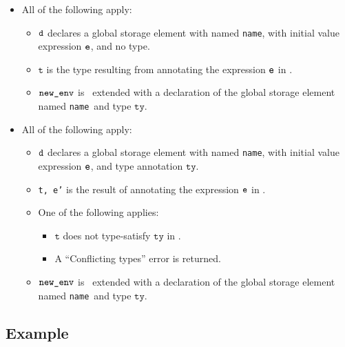 \documentclass{book}
\newcommand\vt[0]{\texttt{t}}
\newcommand\tty[0]{\texttt{ty}}
\newcommand\vep[0]{\texttt{e'}}
\newcommand\name[0]{\texttt{name}}
\begin{document}
\begin{itemize}
  \item All of the following apply:
  \begin{itemize}
    \item $\texttt{d}$ declares a global storage element with named \name, with initial value expression $\texttt{e}$, and no type.
    \item $\vt$ is the type resulting from annotating the expression $\texttt{e}$ in \tenv.
    \item $\texttt{new\_env}$ is \tenv\ extended with a declaration of the global storage element named \name\ and type $\tty$.
  \end{itemize}

  \item All of the following apply:
  \begin{itemize}
    \item $\texttt{d}$ declares a global storage element with named \name, with initial value expression $\texttt{e}$, and type annotation $\tty$.
    \item \texttt{t, \vep} is the result of annotating the expression $\texttt{e}$ in \tenv.
    \item One of the following applies:
    \begin{itemize}
      \item $\vt$ does not type-satisfy $\tty$ in \tenv.
      \item A ``Conflicting types'' error is returned.
    \end{itemize}
    \item $\texttt{new\_env}$ is \tenv\ extended with a declaration of the global storage element named \name\ and type $\tty$.
  \end{itemize}
\end{itemize}

\subsection{Example}
\end{document}
